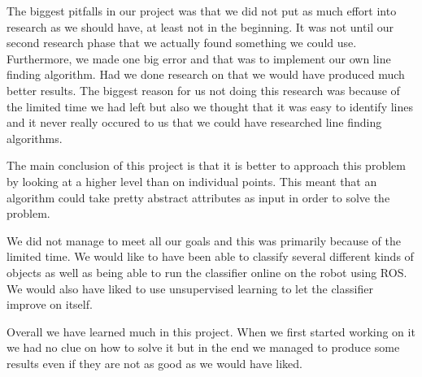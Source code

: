 \documentclass[a4paper, 10pt, conference]{ieeeconf}      %
\begin{document}
The biggest pitfalls in our project was that we did not put as much effort into research as we should have, at least not in the beginning. It was not until our second research phase that we actually found something we could use. Furthermore, we made one big error and that was to implement our own line finding algorithm. Had we done research on that we would have produced much better results. The biggest reason for us not doing this research was because of the limited time we had left but also we thought that it was easy to identify lines and it never really occured to us that we could have researched line finding algorithms.

The main conclusion of this project is that it is better to approach this problem by looking at a higher level than on individual points. This meant that an algorithm could take pretty abstract attributes as input in order to solve the problem.

We did not manage to meet all our goals and this was primarily because of the limited time. We would like to have been able to classify several different kinds of objects as well as being able to run the classifier online on the robot using ROS. We would also have liked to use unsupervised learning to let the classifier improve on itself.

Overall we have learned much in this project. When we first started working on it we had no clue on how to solve it but in the end we managed to produce some results even if they are not as good as we would have liked.













\end{document}
